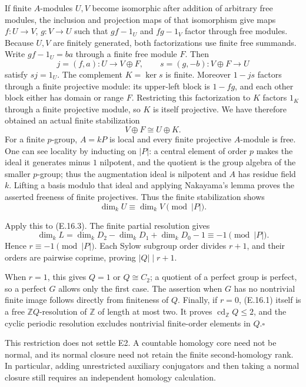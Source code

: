 If finite $A$-modules $U,V$ become isomorphic after addition
of arbitrary free modules, the inclusion and projection maps
of that isomorphism give maps $f:U\to V$, $g:V\to U$ such
that $gf-1_U$ and $fg-1_V$ factor through free modules.
Because $U,V$ are finitely generated, both factorizations
use finite free summands. Write $gf-1_U=ba$ through a finite
free module $F$. Then
\[
 j=(f,a):U\longrightarrow V\oplus F,
 \qquad s=(g,-b):V\oplus F\longrightarrow U
\]
satisfy $sj=1_U$. The complement $K=\ker s$ is finite.
Moreover $1-js$ factors through a finite projective module:
its upper-left block is $1-fg$, and each other block either
has domain or range $F$. Restricting this factorization to
$K$ factors $1_K$ through a finite projective module, so
$K$ is itself projective. We have therefore obtained an
actual finite stabilization
\[
                         V\oplus F\cong U\oplus K.
\]
For a finite $p$-group, $A=kP$ is local and every finite
projective $A$-module is free. One can see locality by
inducting on $|P|$: a central element of order $p$ makes
the ideal it generates minus $1$ nilpotent, and the quotient
is the group algebra of the smaller $p$-group; thus the
augmentation ideal is nilpotent and $A$ has residue field $k$.
Lifting a basis modulo that ideal and applying Nakayama's
lemma proves the asserted freeness of finite projectives.
Thus the finite stabilization shows
\[
                         \dim_k U\equiv\dim_k V\pmod{|P|}.
\]

Apply this to (E.16.3). The finite partial resolution gives
\[
 \dim_k L=\dim_k D_2-\dim_k D_1+\dim_k D_0-1
          \equiv-1\pmod{|P|}.
\]
Hence $r\equiv-1\pmod{|P|}$. Each Sylow subgroup order
divides $r+1$, and their orders are pairwise coprime, proving
$|Q|\mid r+1$.

When $r=1$, this gives $Q=1$ or $Q\cong C_2$; a quotient
of a perfect group is perfect, so a perfect $G$ allows only
the first case. The assertion when $G$ has no nontrivial
finite image follows directly from finiteness of $Q$.
Finally, if $r=0$, (E.16.1) itself is a free
$\mathbb ZQ$-resolution of $\mathbb Z$ of length at most two.
It proves $\operatorname{cd}_{\mathbb Z}Q\leq2$, and the
cyclic periodic resolution excludes nontrivial finite-order
elements in $Q$.\hfill$\square$

This restriction does not settle E2. A countable homology
core need not be normal, and its normal closure need not
retain the finite second-homology rank. In particular, adding
unrestricted auxiliary conjugators and then taking a normal
closure still requires an independent homology calculation.
